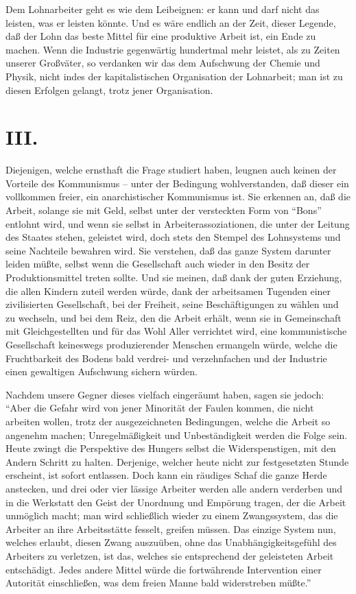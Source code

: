 \documentclass{scrbook}
\begin{document}
Dem Lohnarbeiter geht es wie dem Leibeignen: er kann und darf nicht das leisten, was er leisten könnte. Und es wäre endlich an der Zeit, dieser Legende, daß der Lohn das beste Mittel für eine produktive Arbeit ist, ein Ende zu machen. Wenn die Industrie gegenwärtig hundertmal mehr leistet, als zu Zeiten unserer Großväter, so verdanken wir das dem Aufschwung der Chemie und Physik, nicht indes der kapitalistischen Organisation der Lohnarbeit; man ist zu diesen Erfolgen gelangt, trotz jener Organisation.

\section*{III.}

Diejenigen, welche ernsthaft die Frage studiert haben, leugnen auch keinen der Vorteile des Kommunismus – unter der Bedingung wohlverstanden, daß dieser ein vollkommen freier, ein anarchistischer Kommunismus ist. Sie erkennen an, daß die Arbeit, solange sie mit Geld, selbst unter der versteckten Form von ``Bons'' entlohnt wird, und wenn sie selbst in Arbeiterassoziationen, die unter der Leitung des Staates stehen, geleistet wird, doch stets den Stempel des Lohnsystems und seine Nachteile bewahren wird. Sie verstehen, daß das ganze System darunter leiden müßte, selbst wenn die Gesellschaft auch wieder in den Besitz der Produktionsmittel treten sollte. Und sie meinen, daß dank der guten Erziehung, die allen Kindern zuteil werden würde, dank der arbeitsamen Tugenden einer zivilisierten Gesellschaft, bei der Freiheit, seine Beschäftigungen zu wählen und zu wechseln, und bei dem Reiz, den die Arbeit erhält, wenn sie in Gemeinschaft mit Gleichgestellten und für das Wohl Aller verrichtet wird, eine kommunistische Gesellschaft keineswegs produzierender Menschen ermangeln würde, welche die Fruchtbarkeit des Bodens bald verdrei- und verzehnfachen und der Industrie einen gewaltigen Aufschwung sichern würden.

Nachdem unsere Gegner dieses vielfach eingeräumt haben, sagen sie jedoch: ``Aber die Gefahr wird von jener Minorität der Faulen kommen, die nicht arbeiten wollen, trotz der ausgezeichneten Bedingungen, welche die Arbeit so angenehm machen; Unregelmäßigkeit und Unbeständigkeit werden die Folge sein. Heute zwingt die Perspektive des Hungers selbst die Widerspenstigen, mit den Andern Schritt zu halten. Derjenige, welcher heute nicht zur festgesetzten Stunde erscheint, ist sofort entlassen. Doch kann ein räudiges Schaf die ganze Herde anstecken, und drei oder vier lässige Arbeiter werden alle andern verderben und in die Werkstatt den Geist der Unordnung und Empörung tragen, der die Arbeit unmöglich macht; man wird schließlich wieder zu einem Zwangssystem, das die Arbeiter an ihre Arbeitsstätte fesselt, greifen müssen. Das einzige System nun, welches erlaubt, diesen Zwang auszuüben, ohne das Unabhängigkeitsgefühl des Arbeiters zu verletzen, ist das, welches sie entsprechend der geleisteten Arbeit entschädigt. Jedes andere Mittel würde die fortwährende Intervention einer Autorität einschließen, was dem freien Manne bald widerstreben müßte.''
\end{document}
